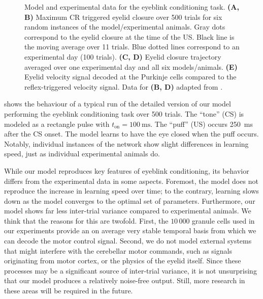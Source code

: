 \begin{figure}[t]
	\centering%
	\caption[Model and experimental data for the eyeblink conditioning task.]{Model and experimental data for the eyeblink conditioning task. \textbf{(A, B)} Maximum CR triggered eyelid closure over 500 trials for six random instances of the model/experimental animals. Gray dots correspond to the eyelid closure at the time of the US. Black line is the moving average over 11 trials. Blue dotted lines correspond to an experimental day (100 trials). \textbf{(C, D)} Eyelid closure trajectory averaged over one experimental day and all six models/animals. \textbf{(E)} Eyelid velocity signal decoded at the Purkinje cells compared to the reflex-triggered velocity signal. Data for \textbf{(B, D)} adapted from \protect\citet{heiney2014cerebellardependent}.}
	\label{fig:result-basic}
\end{figure}

 shows the behaviour of a typical run of the detailed version of our model performing the eyeblink conditioning task over 500 trials.
The \enquote{tone} (CS) is modeled as a rectangle pulse with $t_\mathrm{on} = \SI{100}{\milli\second}$.
The \enquote{puff} (US) occurs \SI{250}{\milli\second} after the CS onset.
The model learns to have the eye closed when the puff occurs. Notably, individual instances of the network show slight differences in learning speed, just as individual experimental animals do.

While our model reproduces key features of eyeblink conditioning, its behavior differs from the experimental data in some aspects.
Foremost, the model does not reproduce the increase in learning speed over time; to the contrary, learning slows down as the model converges to the optimal set of parameters.
Furthermore, our model shows far less inter-trial variance compared to experimental animals.
We think that the reasons for this are twofold.
First, the $10\,000$ granule cells used in our experiments provide an on average very stable temporal basis from which we can decode the motor control signal.
Second, we do not model external systems that might interfere with the cerebellar motor commands, such as signals originating from motor cortex, or the physics of the eyelid itself.
Since these processes may be a significant source of inter-trial variance, it is not unsurprising that our model produces a relatively noise-free output.
Still, more research in these areas will be required in the future.

